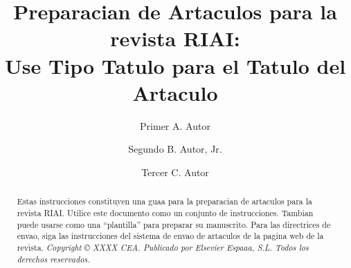 \documentclass[5p,times,authoryear]{elsarticle}
\begin{document}
\begin{frontmatter}






\title{Preparacian de Artaculos para la revista RIAI:\\
Use Tipo Tatulo para el Tatulo del Artaculo}



\author[First]{Primer A. Autor}

\author[Second]{Segundo B. Autor, Jr.}

\author[Third]{Tercer C. Autor}



\address[First]{Comita Espaaol de Automatica, Parc Tecnologic de Barcelona, Edifici U, C/ Llorens i Artigas, 4-6, 08028 Barcelona, Espaaa. }
\address[Second]{Departamento de Automatica, Ingenieraa Electranica e Informatica, Universidad Politacnica de Madrid,  C/ Josa Gutiarrez Abascal, na2, 28006, Madrid,  Espaaa.}
\address[Third]{Departamento de Ingenieraa de Sistemas y Automatica,  Universitat Politacnica de Valencia, Camino de Vera, na14, 46022, Valencia, Espaaa.}

\begin{abstract}
Estas instrucciones constituyen una guaa para la preparacian de
artaculos para la revista RIAI. Utilice este documento como un
conjunto de instrucciones. Tambian puede usarse como
una ``plantilla'' para preparar su manuscrito. Para las directrices
de envao, siga las instrucciones del sistema de envao de artaculos
de la pagina web de la revista. \emph{Copyright {\copyright} XXXX CEA. Publicado por Elsevier Espaaa, S.L. Todos los derechos reservados.}
\end{abstract}


\end{frontmatter}
\end{document}
